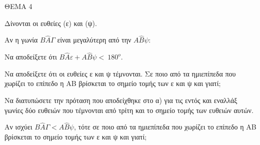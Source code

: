 
ΘΕΜΑ 4

Δίνονται οι ευθείες (ε) και (ψ).

\begin{alist}
\item Αν η γωνία $Β\widehat{Α}\Gamma$ είναι μεγαλύτερη από την $Α\widehat{Β}\psi$:

\begin{rlist}
\item Να αποδείξετε ότι $Β\widehat{Α}\varepsilon + Α\widehat{Β}\psi < \ 180^{ο}$. 

\item Να αποδείξετε ότι οι ευθείες ε και ψ τέμνονται. Σε ποιο από τα ημιεπίπεδα που χωρίζει το επίπεδο η ΑΒ βρίσκεται το σημείο τομής των ε και ψ και γιατί;


\end{rlist}
\item Να διατυπώσετε την πρόταση που αποδείχθηκε στο α) για τις εντός και εναλλάξ γωνίες δύο ευθειών που τέμνονται από τρίτη και το σημείο τομής των ευθειών αυτών.


\item Αν ισχύει $Β\widehat{Α}\Gamma < Α\widehat{Β}\psi$, τότε σε ποιο από τα ημιεπίπεδα που χωρίζει το επίπεδο η ΑΒ βρίσκεται το σημείο τομής των ε και ψ και γιατί; 


\end{alist}
